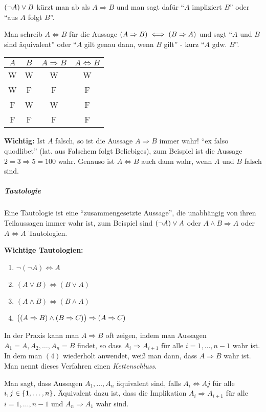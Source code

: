\documentclass{scrreprt}
\begin{document}
$\qty(\neg A) \lor B$ kürzt man ab als $A \Rightarrow B$ und man sagt dafür
``$A$ impliziert $B$'' oder ``aus $A$ folgt $B$''.

Man schreib $A \iff B$ für die Aussage
$\qty(A \Rightarrow B) \iff \qty(B \Rightarrow A)$ und sagt ``$A$ und $B$ sind
äquivalent'' oder ``$A$ gilt genau dann, wenn $B$ gilt'' - kurz ``$A$ gdw. $B$''.

\begin{center}
  \begin{tabular}{c | c | c | c}
    $A$ & $B$ & $A \Rightarrow B$ & $A \iff B$ \\
    \hline
    W & W & W & W \\
    W & F & F & F \\
    F & W & W & F \\
    F & F & F & F
  \end{tabular}
\end{center}

\textbf{Wichtig:} Ist $A$ falsch, so ist die Aussage $A \Rightarrow B$ immer
wahr! ``ex falso quodlibet'' (lat. aus Falschem folgt Beliebiges), zum Beispiel
ist die Aussage $2 = 3 \Rightarrow 5 = 100$ wahr.
Genauso ist $A \iff B$ auch dann wahr, wenn $A$ und $B$ falsch sind.

\subparagraph{Tautologie} Eine Tautologie ist eine ``zusammengesetzte Aussage'',
die unabhängig von ihren Teilaussagen immer wahr ist, zum Beispiel sind
$\qty(\neg A) \lor A$ oder $A \land B \Rightarrow A$ oder $A \iff A$
Tautologien.

\textbf{Wichtige Tautologien:}
\begin{enumerate}[(1)]
\item $\neg(\neg A) \iff A$
\item $(A \lor B) \iff (B \lor A)$
\item $(A \land B) \iff (B \land A)$
\item
  \label{taut_4}
  $\qty\big((A \Rightarrow B) \land (B \Rightarrow C))
  \Rightarrow (A \Rightarrow C)$
\end{enumerate}

In der Praxis kann man $A \Rightarrow B$ oft zeigen, indem man Aussagen
$A_1 = A, A_2, \ldots, A_n = B$ findet, so dass $A_i \Rightarrow A_{i + 1}$
für alle $i = 1, \ldots, n - 1$ wahr ist.
In dem man $\hyperref[taut_4]{(4)}$ wiederholt anwendet, weiß man dann, dass
$A \Rightarrow B$ wahr ist.
Man nennt dieses Verfahren einen \emph{Kettenschluss}.

Man sagt, dass Aussagen $A_1, \ldots, A_n$ äquivalent sind, falls
$A_i \iff Aj$ für alle $i, j \in \qty{1, \ldots, n}$.
Äquivalent dazu ist, dass die Implikation $A_i \Rightarrow A_{i + 1}$ für
alle $i = 1, \ldots, n - 1$ und $A_n \Rightarrow A_1$ wahr sind.
\end{document}
